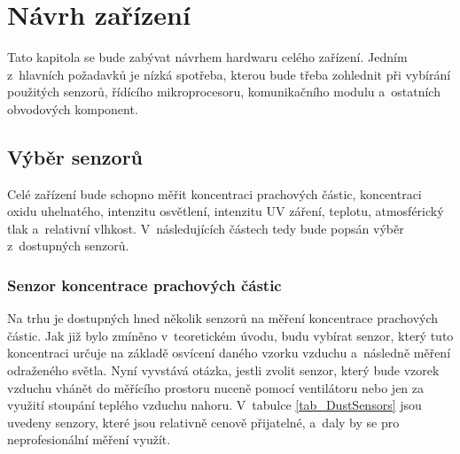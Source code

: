 \chapter{Návrh zařízení}

Tato kapitola se bude zabývat návrhem hardwaru celého zařízení. Jedním z~hlavních požadavků je nízká spotřeba, kterou bude třeba zohlednit při vybírání použitých senzorů, řídícího mikroprocesoru, komunikačního modulu a~ostatních obvodových komponent. 

\section{Výběr senzorů}
Celé zařízení bude schopno měřit koncentraci prachových částic, koncentraci oxidu uhelnatého, intenzitu osvětlení, intenzitu UV záření, teplotu, atmosférický tlak a~relativní vlhkost. V~následujících částech tedy bude popsán výběr z~dostupných senzorů.

\subsection{Senzor koncentrace prachových částic}

Na trhu je dostupných hned několik senzorů na měření koncentrace prachových částic. Jak již bylo zmíněno v~teoretickém úvodu, budu vybírat senzor, který tuto koncentraci určuje na základě osvícení daného vzorku vzduchu a~následně měření odraženého světla. Nyní vyvstává otázka, jestli zvolit senzor, který bude vzorek vzduchu vhánět do měřícího prostoru nuceně pomocí ventilátoru nebo jen za využití stoupání teplého vzduchu nahoru. V~tabulce \ref{tab_DustSensors} jsou uvedeny senzory, které jsou relativně cenově přijatelné, a~daly by se pro neprofesionální měření využít.

\newcommand{\ugcm}{\micro\gram\per\cubic\meter} %

